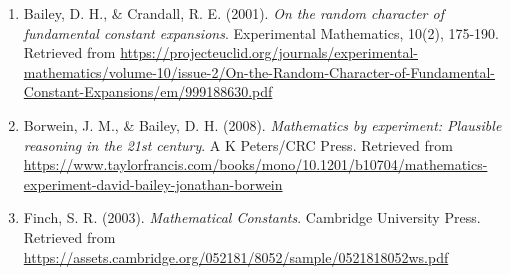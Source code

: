
\begin{enumerate}
    \item Bailey, D. H., \& Crandall, R. E. (2001). \textit{On the random character of fundamental constant expansions}. Experimental Mathematics, 10(2), 175-190. Retrieved from \href{https://projecteuclid.org/journals/experimental-mathematics/volume-10/issue-2/On-the-Random-Character-of-Fundamental-Constant-Expansions/em/999188630.pdf}{https://projecteuclid.org/journals/experimental-mathematics/volume-10/issue-2/On-the-Random-Character-of-Fundamental-Constant-Expansions/em/999188630.pdf}
    
    \item Borwein, J. M., \& Bailey, D. H. (2008). \textit{Mathematics by experiment: Plausible reasoning in the 21st century}. A K Peters/CRC Press. Retrieved from \href{https://www.taylorfrancis.com/books/mono/10.1201/b10704/mathematics-experiment-david-bailey-jonathan-borwein}{https://www.taylorfrancis.com/books/mono/10.1201/b10704/mathematics-experiment-david-bailey-jonathan-borwein}
    
    \item Finch, S. R. (2003). \textit{Mathematical Constants}. Cambridge University Press. Retrieved from \href{https://assets.cambridge.org/052181/8052/sample/0521818052ws.pdf}{https://assets.cambridge.org/052181/8052/sample/0521818052ws.pdf}
    
\end{enumerate}

